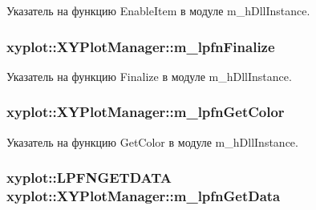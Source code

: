 Указатель на функцию Enable\-Item в модуле m\-\_\-h\-Dll\-Instance. 

\hypertarget{group__gr_func_pointers_ga9cdc9837f474268e30378babb487589c}{
\subsubsection[{m\-\_\-lpfn\-Finalize}]{ xyplot\-::\-X\-Y\-Plot\-Manager\-::m\-\_\-lpfn\-Finalize\hspace{0.3cm}{\ttfamily [protected]}}}\label{group__gr_func_pointers_ga9cdc9837f474268e30378babb487589c}


Указатель на функцию Finalize в модуле m\-\_\-h\-Dll\-Instance. 

\hypertarget{group__gr_func_pointers_gaea89de1aabb85ec0bc1744be6c4b8c0e}{
\subsubsection[{m\-\_\-lpfn\-Get\-Color}]{ xyplot\-::\-X\-Y\-Plot\-Manager\-::m\-\_\-lpfn\-Get\-Color\hspace{0.3cm}{\ttfamily [protected]}}}\label{group__gr_func_pointers_gaea89de1aabb85ec0bc1744be6c4b8c0e}


Указатель на функцию Get\-Color в модуле m\-\_\-h\-Dll\-Instance. 

\hypertarget{group__gr_func_pointers_gaf08ccb9c45b77898ac5a5c024b7b6268}{
\subsubsection[{m\-\_\-lpfn\-Get\-Data}]{\setlength{\rightskip}{0pt plus 5cm}xyplot\-::\-L\-P\-F\-N\-G\-E\-T\-D\-A\-T\-A xyplot\-::\-X\-Y\-Plot\-Manager\-::m\-\_\-lpfn\-Get\-Data\hspace{0.3cm}{\ttfamily [protected]}}}\label{group__gr_func_pointers_gaf08ccb9c45b77898ac5a5c024b7b6268}


